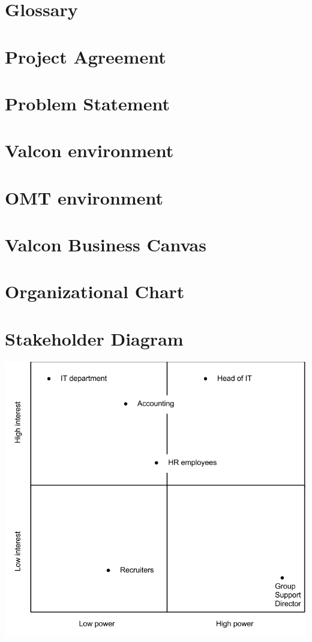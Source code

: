 \chapter{Glossary}

\chapter{Project Agreement}

\chapter{Problem Statement}

\chapter{Valcon environment}

\chapter{OMT environment}

\chapter{Valcon Business Canvas}


\label{app:it_strategy}

\chapter{Organizational Chart}

\chapter{Stakeholder Diagram}
\label{app:stakeholder_diagram}
\includegraphics{appendix/stakeholder_diagram.png}
